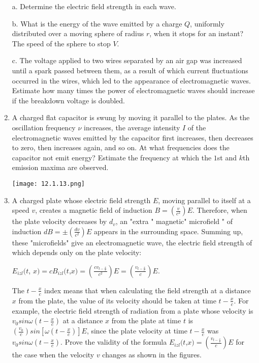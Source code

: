 \documentclass{article}
\begin{document}
\begin{enumerate}[label=12.1.\arabic*]
a. Determine the electric field strength in each wave. 

b. What is the energy of the wave emitted by a charge $Q$, uniformly distributed over a moving sphere of radius $r$, when it stops for an instant? The speed of the sphere to stop $V$.

c. The voltage applied to two wires separated by an air gap was increased until a spark passed between them, as a result of which current fluctuations occurred in the wires, which led to the appearance of electromagnetic waves. Estimate how many times the power of electromagnetic waves should increase if the breakdown voltage is doubled.

\item A charged flat capacitor is swung by moving it parallel to the plates. As the oscillation frequency $\nu$ increases, the average intensity $I$ of the electromagnetic waves emitted by the capacitor first increases, then decreases to zero, then increases again, and so on. At what frequencies does the capacitor not emit energy? Estimate the frequency at which the $1$st and $k$th emission maxima are observed.

\begin{center}
    \texttt{[image: 12.1.13.png]}
\end{center}


\item A charged plate whose electric field strength $E$, moving parallel to itself at a speed $v$, creates a magnetic field of induction $B = (\frac{v}{c^2}) E$. Therefore, when the plate velocity decreases by $d_v$, an "extra " magnetic" microfield " of induction $dB = \pm (\frac{dv}{c^2}) E$ appears in the surrounding space. Summing up, these "microfields" give an electromagnetic wave, the electric field strength of which depends only on the plate velocity:

$E_{izl} (t$, $x) = cB_{izl}(t$,$ x) = (\frac{cv_{t - \frac{x}{c}}}{c^2}) E = (\frac{v_{t - \frac{x}{c}}}{c}) E$.

The $t - \frac{x}{c}$ index means that when calculating the field strength at a distance $x$ from the plate, the value of its velocity should be taken at time $t - \frac{x}{c}$. For example, the electric field strength of radiation from a plate whose velocity is $v_0 sin \omega (t - \frac{x}{c})$ at a distance $x$ from the plate at time $t$ is $(\frac{v_0}{c}) sin [\omega(t - \frac{x}{c})] E$, since the plate velocity at time $t - \frac{x}{c}$ was $v_0 sin \omega(t - \frac{x}{c})$. Prove the validity of the formula $E_{izl}(t$,$ x) = (\frac{v_{t - \frac{x}{c}}}{c}) E$ for the case when the velocity $v$ changes as shown in the figures.


\end{enumerate}
\end{document}
